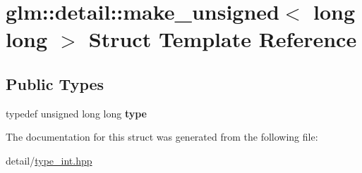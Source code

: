 \hypertarget{structglm_1_1detail_1_1make__unsigned_3_01long_01long_01_4}{\section{glm\-:\-:detail\-:\-:make\-\_\-unsigned$<$ long long $>$ Struct Template Reference}
\label{structglm_1_1detail_1_1make__unsigned_3_01long_01long_01_4}
}
\subsection*{Public Types}
\begin{DoxyCompactItemize}
\item 
\hypertarget{structglm_1_1detail_1_1make__unsigned_3_01long_01long_01_4_adb9a738bcdd4b53058383168bb8585b1}{typedef unsigned long long {\bfseries type}}\label{structglm_1_1detail_1_1make__unsigned_3_01long_01long_01_4_adb9a738bcdd4b53058383168bb8585b1}

\end{DoxyCompactItemize}


The documentation for this struct was generated from the following file\-:\begin{DoxyCompactItemize}
\item 
detail/\hyperlink{type__int_8hpp}{type\-\_\-int.\-hpp}\end{DoxyCompactItemize}
